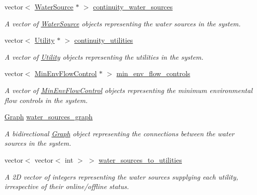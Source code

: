 \begin{DoxyCompactItemize}
\item 
vector$<$ \mbox{\hyperlink{classWaterSource}{Water\+Source}} $\ast$ $>$ \mbox{\hyperlink{classContinuityModel_a3980284a9dd08bae4e76398d1b0d6f55}{continuity\+\_\+water\+\_\+sources}}
\begin{DoxyCompactList}\small\item\em A vector of \mbox{\hyperlink{classWaterSource}{Water\+Source}} objects representing the water sources in the system. \end{DoxyCompactList}\item 
vector$<$ \mbox{\hyperlink{classUtility}{Utility}} $\ast$ $>$ \mbox{\hyperlink{classContinuityModel_adc77a0214d553a961035ce86c93cf9be}{continuity\+\_\+utilities}}
\begin{DoxyCompactList}\small\item\em A vector of \mbox{\hyperlink{classUtility}{Utility}} objects representing the utilities in the system. \end{DoxyCompactList}\item 
vector$<$ \mbox{\hyperlink{classMinEnvFlowControl}{Min\+Env\+Flow\+Control}} $\ast$ $>$ \mbox{\hyperlink{classContinuityModel_afc991e5c0d144020e49a97751a04b302}{min\+\_\+env\+\_\+flow\+\_\+controls}}
\begin{DoxyCompactList}\small\item\em A vector of \mbox{\hyperlink{classMinEnvFlowControl}{Min\+Env\+Flow\+Control}} objects representing the minimum environmental flow controls in the system. \end{DoxyCompactList}\item 
\mbox{\hyperlink{classGraph}{Graph}} \mbox{\hyperlink{classContinuityModel_a563401588c6fa622f03393909a3522db}{water\+\_\+sources\+\_\+graph}}
\begin{DoxyCompactList}\small\item\em A bidirectional \mbox{\hyperlink{classGraph}{Graph}} object representing the connections between the water sources in the system. \end{DoxyCompactList}\item 
vector$<$ vector$<$ int $>$ $>$ \mbox{\hyperlink{classContinuityModel_ae8516bcbbf52650190277fc8b06c1843}{water\+\_\+sources\+\_\+to\+\_\+utilities}}
\begin{DoxyCompactList}\small\item\em A 2D vector of integers representing the water sources supplying each utility, irrespective of their online/offline status. \end{DoxyCompactList}\item 

\end{DoxyCompactItemize}
